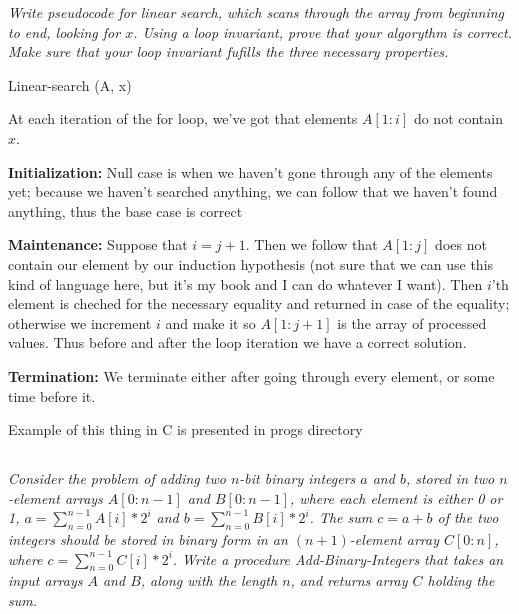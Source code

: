 \documentclass[11pt,oneside,titlepage]{book}
\begin{document}
\textit{Write pseudocode for linear search, which scans through the array from beginning to
  end, looking for $x$. Using a loop invariant, prove that your algorythm is correct.
  Make sure that your loop invariant fufills the three necessary properties.}

\begin{function}
  \caption{Linear-search (A, x)}
  \;

\end{function}

At each iteration of the for loop, we've got that elements $A[1:i]$ do not contain $x$.

\textbf{Initialization: }
Null case is when we haven't gone through any of the elements yet;
because we haven't searched anything, we
can follow that we haven't found anything, thus the base case is correct

\textbf{Maintenance: }
Suppose that $i = j + 1$. Then we follow that $A[1:j]$ does not contain our element by our
induction hypothesis (not sure that we can use this kind of language here, but it's
my book and I can do whatever I want). Then $i$'th element is cheched for the necessary
equality and returned in case of the equality; otherwise we increment $i$ and make it so
$A[1: j + 1]$ is the array of processed values. Thus before and after the loop iteration
we have a correct solution.

\textbf{Termination: }
We terminate either after going through every element, or some time before it.

Example of this thing in C is presented in progs directory


\subsection{}

\textit{Consider the problem of adding two $n$-bit binary integers $a$ and $b$, stored in
  two $n$-element arrays $A[0: n - 1]$ and $B[0: n - 1]$, where each element is either 0 or 1,
  $a = \sum_{n = 0}^{n - 1}A[i] * 2^i$ and $b = \sum_{n = 0}^{n - 1}B[i] * 2^i$. The
  sum $c = a + b$ of the two integers should be stored in binary form in an $(n + 1)$-element array
  $C[0:n]$, where   $c = \sum_{n = 0}^{n - 1}C[i] * 2^i$. Write a procedure Add-Binary-Integers
  that takes an input arrays $A$ and $B$, along with the length $n$, and returns array $C$ holding
  the sum.}
\end{document}
